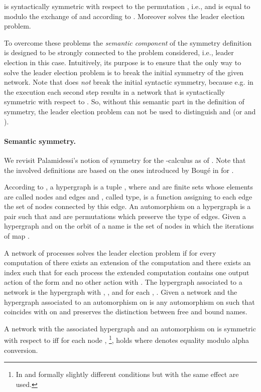 \documentclass[11pt,techReport]{eptcs}
\begin{document}
 is syntactically symmetric with respect to the permutation , i.e.,  and  is equal to  modulo the exchange of  and  according to . Moreover  solves the leader election problem.

To overcome these problems the \emph{semantic component} of the symmetry definition is designed to be strongly connected to the problem considered, i.e., leader election in this case. Intuitively, its purpose is to ensure that the only way to solve the leader election problem is to break the initial symmetry of the given network. Note that  does \emph{not} break the initial syntactic symmetry, because e.g. in the execution  each second step results in a network that is syntactically symmetric with respect to .  So, without this semantic part in the definition of symmetry, the leader election problem can not be used to distinguish \pimix and \pisep (or \cspmix and \cspin).

\paragraph{Semantic symmetry.}
\label{sec:semantic-symmetry}

We revisit Palamidessi's notion of symmetry for the -calculus as of \cite{palamidessi03}. Note that the involved definitions are based on the ones introduced by Boug\'{e} in \cite{bouge88} for \csp.

According to \cite{palamidessi03}, a hypergraph is a tuple , where  and  are finite sets whose elements are called nodes and edges and , called type, is a function assigning to each edge the set of nodes connected by this edge. An automorphism on a hypergraph is a pair  such that  and  are permutations which preserve the type of edges. Given a hypergraph  and  on  the orbit of a name  is the set of nodes in which the iterations of  map .

A network  of  processes solves the leader election problem if for every computation of  there exists an extension of the computation and there exists an index  such that for each process the extended computation contains one output action of the form  and no other action  with . The hypergraph associated to a network  is the hypergraph  with , , and for each , . Given a network  and the hypergraph  associated to  an automorphism on  is any automorphism  on  such that  coincides with  on  and  preserves the distinction between free and bound names.

A network  with the associated hypergraph  and an automorphism  on  is symmetric with respect to  iff for each node , \footnote{In \cite{bouge88} and \cite{vigliottiPhillipsPalamidessi07} formally slightly different conditions but with the same effect are used.}, holds where  denotes equality modulo alpha conversion.
\end{document}
